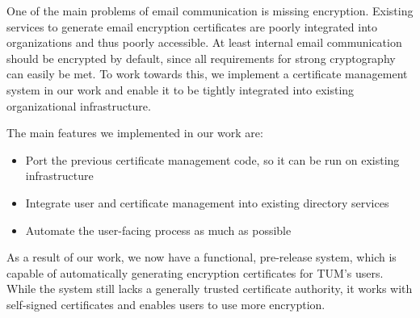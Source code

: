\small

One of the main problems of email communication is missing encryption.
Existing services to generate email encryption certificates are poorly integrated into organizations and thus poorly
accessible.
At least internal email communication should be encrypted by default, since all requirements for strong cryptography can
easily be met.
To work towards this, we implement a certificate management system in our work and enable it to be tightly integrated
into existing organizational infrastructure.

The main features we implemented in our work are:
\begin{itemize}
    \item Port the previous certificate management code, so it can be run on existing infrastructure
    \item Integrate user and certificate management into existing directory services
    \item Automate the user-facing process as much as possible
\end{itemize}

As a result of our work, we now have a functional, pre-release system, which is capable of automatically generating
encryption certificates for TUM's users.
While the system still lacks a generally trusted certificate authority, it works with self-signed certificates and
enables users to use more encryption.
